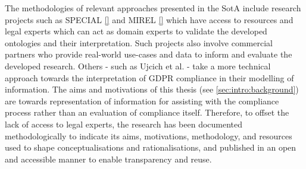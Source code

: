The methodologies of relevant approaches presented in the SotA include research projects such as SPECIAL \autoref{} and MIREL \autoref{} which have access to resources and legal experts which can act as domain experts to validate the developed ontologies and their interpretation. Such projects also involve commercial partners who provide real-world use-cases and data to inform and evaluate the developed research.
Others - such as Ujcich et al. \cite{} - take a more technical approach towards the interpretation of GDPR compliance in their modelling of information.
The aims and motivations of this thesis (see \autoref{sec:intro:background}) are towards representation of information for assisting with the compliance process rather than an evaluation of compliance itself. Therefore, to offset the lack of access to legal experts, the research has been documented methodologically to indicate its aims, motivations, methodology, and resources used to shape conceptualisations and rationalisations, and published in an open and accessible manner to enable transparency and reuse. 

